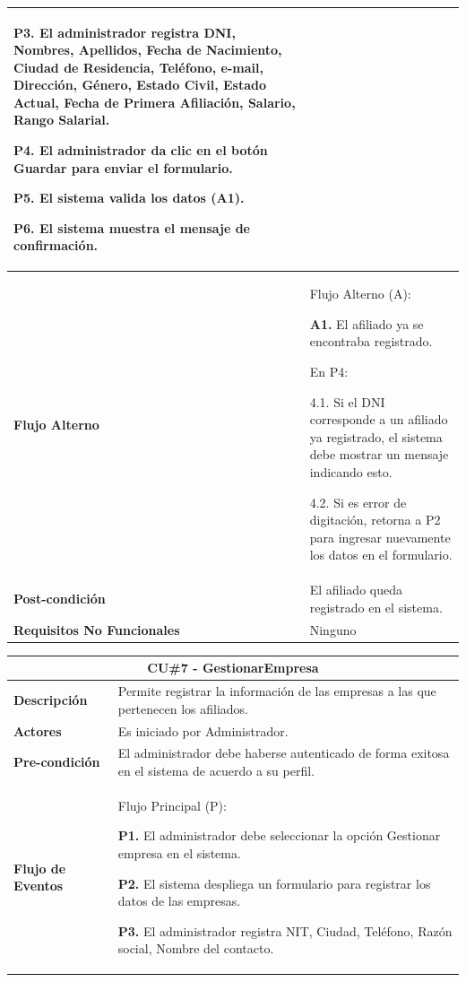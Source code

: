\documentclass[12pt,a4paper]{article}
\begin{document}
\begin{center}
\begin{tabular}{|p{5.5cm}| p{9.5cm}|}
\textbf{P3.} El administrador registra DNI, Nombres, Apellidos, Fecha de Nacimiento, Ciudad de Residencia, Teléfono, e-mail, Dirección, Género, Estado Civil, Estado Actual, Fecha de Primera Afiliación, Salario, Rango Salarial.

\textbf{P4.} El administrador da clic en el botón Guardar para enviar el formulario.

\textbf{P5.} El sistema valida los datos (A1).

\textbf{P6.} El sistema muestra el mensaje de confirmación.
\\
\hline 
\textbf{Flujo Alterno} &  Flujo Alterno (A):

\textbf{A1.} El afiliado ya se encontraba registrado.

	En P4:
	
	4.1. Si el DNI corresponde a un afiliado ya registrado, el sistema debe mostrar un mensaje indicando esto.
	
	4.2. Si es error de digitación, retorna a P2 para ingresar nuevamente los datos en el formulario. \\ 
\hline 
\textbf{Post-condición}  & El afiliado queda registrado en el sistema. \\ 
\hline 
\textbf{Requisitos No Funcionales} & Ninguno \\ 
\hline 
\end{tabular}
\vspace{5mm}

\begin{tabular}{|p{5.5cm}| p{9.5cm}|}
\hline 
\multicolumn{2}{|c|}{\textbf{CU\#7 - GestionarEmpresa}} \\ 
\hline 
\textbf{Descripción} & Permite registrar la información de las empresas a las que pertenecen los afiliados. \\ 
\hline 
\textbf{Actores} & Es iniciado por Administrador. \\ 
\hline 
\textbf{Pre-condición} & El administrador debe haberse autenticado de forma exitosa en el sistema de acuerdo a su perfil. \\ 
\hline 
\textbf{Flujo de Eventos} & Flujo Principal (P):

\textbf{P1.} El administrador debe seleccionar la opción Gestionar empresa en el sistema.

\textbf{P2.} El sistema despliega un formulario para registrar los datos de las empresas.

\textbf{P3.} El administrador registra NIT, Ciudad, Teléfono, Razón social, Nombre del contacto.


\end{tabular}
\end{center}
\end{document}
